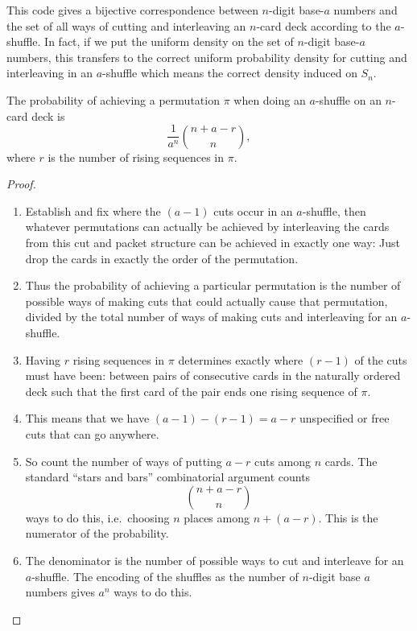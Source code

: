 \documentclass[12pt]{article}
\begin{document}
This code gives a bijective correspondence between \( n \)-digit base-\(
a \) numbers and the set of all ways of cutting and interleaving an \( n
\)-card deck according to the \( a \)-shuffle.  In fact, if we put the
uniform density on the set of \( n \)-digit base-\( a \) numbers, this
transfers to the correct uniform probability density for cutting and
interleaving in an \( a \)-shuffle which means the correct density
induced on \( S_n \).

\begin{theorem}
    The probability of achieving a permutation \( \pi \) when doing an \(
    a \)-shuffle on an \( n \)-card deck is
    \[
        \frac{1}{a^n} \binom{n + a - r}{n},
    \] where \( r \) is the number of rising sequences in \( \pi \).
\end{theorem}

\begin{proof}
    \begin{enumerate}
        \item
            Establish and fix where the \( (a-1) \) cuts occur in an \(
            a \)-shuffle, then whatever permutations can actually be
            achieved by interleaving the cards from this cut and packet
            structure can be achieved in exactly one way:  Just drop the
            cards in exactly the order of the permutation.
        \item
            Thus the probability of achieving a particular permutation
            is the number of possible ways of making cuts that could
            actually cause that permutation, divided by the total number
            of ways of making cuts and interleaving for an \( a \)-shuffle.
        \item
            Having \( r \) rising sequences in \( \pi \) determines
            exactly where \( (r-1) \) of the cuts must have been:
            between pairs of consecutive cards in the naturally ordered
            deck such that the first card of the pair ends one rising
            sequence of \( \pi \).
        \item
            This means that we have \( (a-1) - (r-1) = a-r \)
            unspecified or free cuts that can go anywhere.
        \item
            So count the number of ways of putting \( a-r \) cuts among \(
            n \) cards.  The standard ``stars and bars'' combinatorial
            argument counts
            \[
                \binom{n + a-r}{n}
            \] ways to do this, i.e.\ choosing \( n \) places among \( n
            +(a-r) \).  This is the numerator of the probability.
        \item
            The denominator is the number of possible ways to cut and
            interleave for an \( a \)-shuffle.  The encoding of the
            shuffles as the number of \( n \)-digit base \( a \) numbers
            gives \( a^n \) ways to do this.
    \end{enumerate}
  \end{proof}
\end{document}
